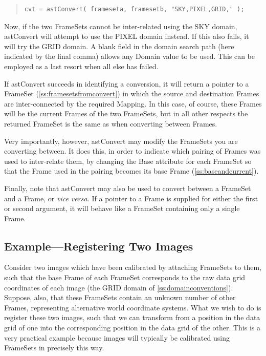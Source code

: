 \documentclass[twoside,11pt]{article}
\newcommand{\htmlref}[2]{#1}
\newcommand{\secref}[1]{\S\ref{#1}}
\renewcommand{\secref}[1]{\ref{#1}}
\begin{document}
\begin{quote}
\small
\begin{verbatim}
cvt = astConvert( frameseta, framesetb, "SKY,PIXEL,GRID," );
\end{verbatim}
\normalsize
\end{quote}

Now, if the two FrameSets cannot be inter-related using the SKY domain,
astConvert will attempt to use the PIXEL domain instead. If this
also fails, it will try the GRID domain. A blank field in the domain
search path (here indicated by the final comma) allows any Domain
value to be used. This can be employed as a last resort when all else
has failed.

If astConvert succeeds in identifying a conversion, it will return a
pointer to a FrameSet (\secref{ss:framesetsfromconvert}) in which the
source and destination Frames are inter-connected by the required
Mapping. In this case, of course, these Frames will be the current
Frames of the two FrameSets, but in all other respects the returned
FrameSet is the same as when converting between Frames.

Very importantly, however, astConvert may modify the FrameSets you are
converting between. It does this, in order to indicate which pairing
of Frames was used to inter-relate them, by changing the \htmlref{Base}{Base}
attribute for each FrameSet so that the Frame used in the pairing
becomes its base Frame (\secref{ss:baseandcurrent}).

Finally, note that astConvert may also be used to convert between a
FrameSet and a Frame, or {\em{vice versa.}} If a pointer to a Frame is
supplied for either the first or second argument, it will behave like
a FrameSet containing only a single Frame.

\subsection{\label{ss:registeringimages}Example---Registering Two Images}

Consider two images which have been calibrated by attaching FrameSets
to them, such that the base \htmlref{Frame}{Frame} of each \htmlref{FrameSet}{FrameSet} corresponds to the
raw data grid coordinates of each image (the GRID domain of
\secref{ss:domainconventions}). Suppose, also, that these FrameSets
contain an unknown number of other Frames, representing alternative
world coordinate systems.  What we wish to do is register these two
images, such that we can transform from a position in the data grid of
one into the corresponding position in the data grid of the other.
This is a very practical example because images will typically be
calibrated using FrameSets in precisely this way.
\end{document}
